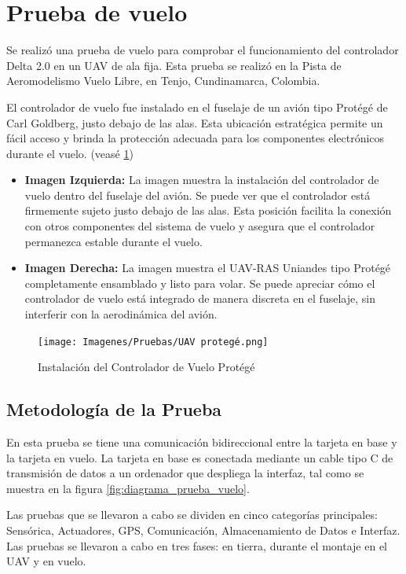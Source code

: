 
\section{Prueba de vuelo}

Se realizó una prueba de vuelo para comprobar el funcionamiento del controlador Delta 2.0 en un UAV de ala fija. Esta prueba se realizó en la Pista de Aeromodelismo Vuelo Libre, en Tenjo, Cundinamarca, Colombia. 

El controlador de vuelo fue instalado en el fuselaje de un avión tipo Protégé de Carl Goldberg, justo debajo de las alas. Esta ubicación estratégica permite un fácil acceso y brinda la protección adecuada para los componentes electrónicos durante el vuelo. (veasé \ref{fig:protege})

\begin{itemize}
    \item \textbf{Imagen Izquierda:} La imagen muestra la instalación del controlador de vuelo dentro del fuselaje del avión. Se puede ver que el controlador está firmemente sujeto justo debajo de las alas. Esta posición facilita la conexión con otros componentes del sistema de vuelo y asegura que el controlador permanezca estable durante el vuelo.
    
    \item \textbf{Imagen Derecha:} La imagen muestra el UAV-RAS Uniandes tipo Protégé completamente ensamblado y listo para volar. Se puede apreciar cómo el controlador de vuelo está integrado de manera discreta en el fuselaje, sin interferir con la aerodinámica del avión.
\end{itemize}


\begin{figure}[H]
    \centering
    \texttt{[image: Imagenes/Pruebas/UAV protegé.png]}
    \caption{Instalación del Controlador de Vuelo Protégé}
    \label{fig:protege}
\end{figure}


\subsection{Metodología de la Prueba}

En esta prueba se tiene una comunicación bidireccional entre la tarjeta en base y la tarjeta en vuelo. La tarjeta en base es conectada mediante un cable tipo C de transmisión de datos a un ordenador que despliega la interfaz, tal como se muestra en la figura \ref{fig:diagrama_prueba_vuelo}.

Las pruebas que se llevaron a cabo se dividen en cinco categorías principales: Sensórica, Actuadores, GPS, Comunicación, Almacenamiento de Datos e Interfaz. Las pruebas se llevaron a cabo en tres fases: en tierra, durante el montaje en el UAV y en vuelo.\\


